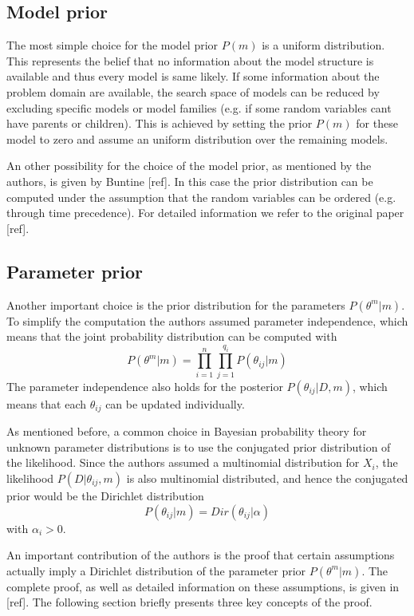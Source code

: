 \documentclass{article}
\begin{document}
	\subsection{Model prior}
	The most simple choice for the model prior $P(m)$ is a uniform distribution. This represents 
	the belief that no information about the model structure is	available and thus every 
	model is same likely. If some information about the problem domain are available, the search space 
	of models can be reduced by excluding specific models or model families (e.g. if some random
	variables cant have parents or children). This is achieved by setting
	the prior $P(m)$ for these model to zero and assume an uniform distribution over the remaining
	models.	
	
	An other possibility for the choice of the model prior, as mentioned by the authors, is given
	by Buntine [ref]. In this case the prior distribution can be computed under the assumption that
	the random variables can be ordered (e.g. through time precedence). For detailed information we
	refer to the original paper [ref].
	
	\subsection{Parameter prior}
	Another important choice is the prior distribution for the parameters $P(\theta^m|m)$. To simplify
	the computation the authors assumed parameter independence, which means that the joint probability
	distribution can be computed with
	\[
		P(\theta^m|m)= \prod_{i=1}^n \prod_{j=1}^{q_i} P(\theta_{ij}|m)
	\]
	The parameter independence also holds for the posterior $P(\theta_{ij}|D,m)$, which means
	that each $\theta_{ij}$ can be updated individually.
	
	As mentioned before, a common choice in Bayesian probability theory for unknown parameter distributions
	is to use the conjugated prior distribution of the likelihood.
	Since the authors assumed a multinomial distribution
	for $X_i$, the likelihood $P(D|\theta_{ij},m)$ is also multinomial distributed, and hence the
	conjugated prior would be the Dirichlet distribution
	\[
		P(\theta_{ij}|m) = Dir(\theta_{ij}|\alpha)
	\]
	with $\alpha_i > 0$.
	
	An important contribution of the authors is the proof that certain assumptions actually 
	imply a Dirichlet distribution of the parameter prior $P(\theta^m|m)$.
	The complete proof, as well as detailed information on these assumptions, is given in [ref].
	The following section briefly presents three key concepts of the proof.
	
\end{document}
